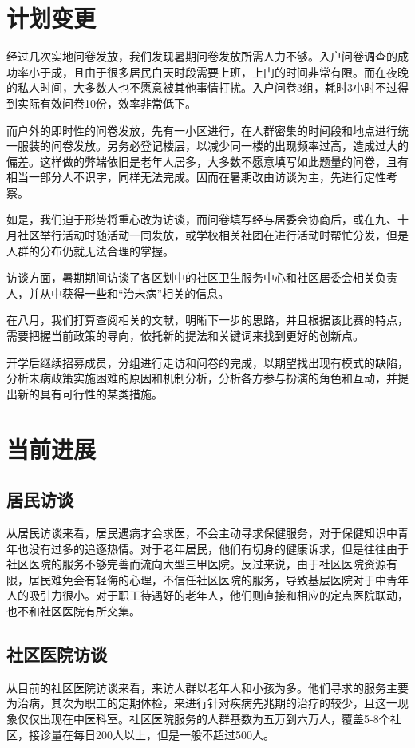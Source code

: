 \documentclass{article}
\begin{document}
    \section{计划变更}
        经过几次实地问卷发放，我们发现暑期问卷发放所需人力不够。入户问卷调查的成功率小于成，且由于很多居民白天时段需要上班，上门的时间非常有限。而在夜晚的私人时间，大多数人也不愿意被其他事情打扰。入户问卷3组，耗时3小时不过得到实际有效问卷10份，效率非常低下。
        
        而户外的即时性的问卷发放，先有一小区进行，在人群密集的时间段和地点进行统一服装的问卷发放。另务必登记楼层，以减少同一楼的出现频率过高，造成过大的偏差。这样做的弊端依旧是老年人居多，大多数不愿意填写如此题量的问卷，且有相当一部分人不识字，同样无法完成。因而在暑期改由访谈为主，先进行定性考察。
        
        如是，我们迫于形势将重心改为访谈，而问卷填写经与居委会协商后，或在九、十月社区举行活动时随活动一同发放，或学校相关社团在进行活动时帮忙分发，但是人群的分布仍就无法合理的掌握。
        
        访谈方面，暑期期间访谈了各区划中的社区卫生服务中心和社区居委会相关负责人，并从中获得一些和“治未病”相关的信息。
    
    在八月，我们打算查阅相关的文献，明晰下一步的思路，并且根据该比赛的特点，需要把握当前政策的导向，依托新的提法和关键词来找到更好的创新点。
    
    开学后继续招募成员，分组进行走访和问卷的完成，以期望找出现有模式的缺陷，分析未病政策实施困难的原因和机制分析，分析各方参与扮演的角色和互动，并提出新的具有可行性的某类措施。
    \section{当前进展}
    \subsection{居民访谈}
    从居民访谈来看，居民遇病才会求医，不会主动寻求保健服务，对于保健知识中青年也没有过多的追逐热情。对于老年居民，他们有切身的健康诉求，但是往往由于社区医院的服务不够完善而流向大型三甲医院。反过来说，由于社区医院资源有限，居民难免会有轻侮的心理，不信任社区医院的服务，导致基层医院对于中青年人的吸引力很小。对于职工待遇好的老年人，他们则直接和相应的定点医院联动，也不和社区医院有所交集。
   
    \subsection{社区医院访谈}
    从目前的社区医院访谈来看，来访人群以老年人和小孩为多。他们寻求的服务主要为治病，其次为职工的定期体检，来进行针对疾病先兆期的治疗的较少，且这一现象仅仅出现在中医科室。社区医院服务的人群基数为五万到六万人，覆盖5-8个社区，接诊量在每日200人以上，但是一般不超过500人。
    
\end{document}
